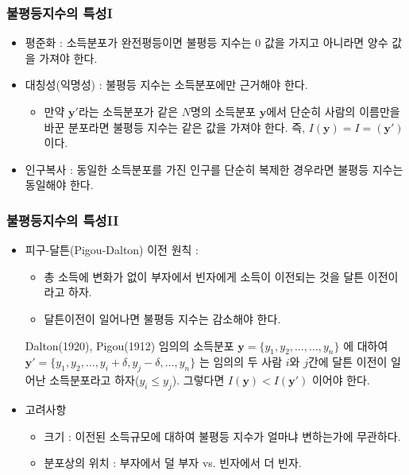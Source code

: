 \documentclass[aspectratio=169,xcolor=dvipsnames,]{beamer}
\newcommand{\y}{\mathbf{y}}
\begin{document}
\begin{frame}[<+->]
\frametitle{불평등지수의 특성I}
    \begin{itemize}
        \item 평준화 : 소득분포가 완전평등이면 불평등 지수는 0 값을 가지고 아니라면 양수 값을 가져야 한다.
        \item 대칭성(익명성) : 불평등 지수는 소득분포에만 근거해야 한다.
        \begin{itemize}
            \item 만약 $\y '$라는 소득분포가 같은 $N$명의 소득분포 $\y$에서 단순히 사람의 이름만을 바꾼 분포라면 불평등 지수는 같은 값을 가져야 한다. 즉, $I(\y) = I=(\y ')$ 이다.
        \end{itemize}
        \item 인구복사 : 동일한 소득분포를 가진 인구를 단순히 복제한 경우라면 불평등 지수는 동일해야 한다.
    \end{itemize}
\end{frame}

\begin{frame}[<+->]
\frametitle{불평등지수의 특성II}
    \begin{itemize}
        \item 피구-달튼(Pigou-Dalton) 이전 원칙 :  
        \begin{itemize}
            \item 총 소득에 변화가 없이 부자에서 빈자에게 소득이 이전되는 것을 달튼 이전이라고 하자. 
            \item 달튼이전이 일어나면 불평등 지수는 감소해야 한다.
        \end{itemize}
    \begin{block}{Dalton(1920), Pigou(1912)}
    임의의 소득분포 $\y = \{y_1 ,y_2 , \ldots , \ldots ,y_n \}$ 에 대하여 $\y ' = \{y_1 ,y_2 , \ldots , y_i + \delta , y_j - \delta , \ldots ,y_n \}$ 는 임의의 두 사람 $i$와 $j$간에 달튼 이전이 일어난 소득분포라고 하자($y_i \leq y_j$). 그렇다면 $I(\y) < I(\y ')$ 이어야 한다.
    \end{block}
    \item 고려사항
    \begin{itemize}
        \item 크기 : 이전된 소득규모에 대하여 불평등 지수가 얼마냐 변하는가에 무관하다.
        \item 분포상의 위치 : 부자에서 덜 부자 vs. 빈자에서 더 빈자.
    \end{itemize}
    \end{itemize}
\end{frame}
\end{document}
